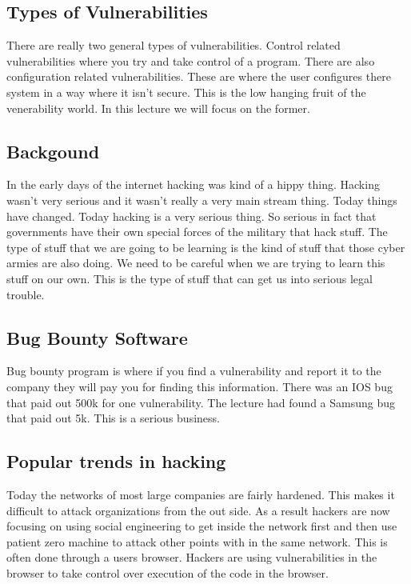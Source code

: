 \documentclass[letterpaper, onecolumn,10pt]{IEEEtran}
\begin{document}
		    \subsection{Types of Vulnerabilities}
		    There are really two general types of vulnerabilities. Control related vulnerabilities where you try and take control of a program. There are also configuration related vulnerabilities. These are where the user configures there system in a way where it isn't secure. This is the low hanging fruit of the venerability world. In this lecture we will focus on the former.\\
		    
		    \subsection{Backgound}
		    In the early days of the internet hacking was kind of a hippy thing. Hacking wasn't very serious and it wasn't really a very main stream thing. Today things have changed. Today hacking is a very serious thing. So serious in fact that governments have their own special forces of the military that hack stuff. The type of stuff that we are going to be learning is the kind of stuff that those cyber armies are also doing. We need to be careful when we are trying to learn this stuff on our own. This is the type of stuff that can get us into serious legal trouble.\\
		    
		    \subsection{Bug Bounty Software}
		    Bug bounty program is where if you find a vulnerability and report it to the company they will pay you for finding this information. There was an IOS bug that paid out 500k for one vulnerability. The lecture had found a Samsung bug that paid out 5k. This is a serious business.\\
		    
		    \subsection{Popular trends in hacking}
		    Today the networks of most large companies are fairly hardened. This makes it difficult to attack organizations from the out side. As a result hackers are now focusing on using social engineering to get inside the network first and then use patient zero machine to attack other points with in the same network. This is often done through a users browser. Hackers are using vulnerabilities in the browser to take control over execution of the code in the browser.\\
		    
\end{document}
